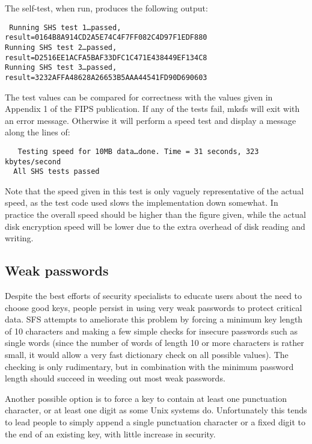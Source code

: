 The self-test, when run, produces the following output:

{\small \tt
  Running SHS test 1\dots passed, result=0164B8A914CD2A5E74C4F7FF082C4D97F1EDF880\\
  Running SHS test 2\dots passed, result=D2516EE1ACFA5BAF33DFC1C471E438449EF134C8\\
  Running SHS test 3\dots passed, result=3232AFFA48628A26653B5AAA44541FD90D690603}

The test values can be compared for correctness with the values given in
Appendix 1 of the FIPS publication.  If any of the tests fail, mksfs will exit
with an error message.  Otherwise it will perform a speed test and display a
message along the lines of:

{\small \tt
\verb|  |Testing speed for 10MB data\dots done.  Time = 31 seconds, 323 kbytes/second\\
\verb|  |All SHS tests passed
}

Note that the speed given in this test is only vaguely representative of the
actual speed, as the test code used slows the implementation down somewhat.  In
practice the overall speed should be higher than the figure given, while the
actual disk encryption speed will be lower due to the extra overhead of disk
reading and writing.


\subsection{Weak passwords}

Despite the best efforts of security specialists to educate users about the
need to choose good keys, people persist in using very weak passwords to protect
critical data.  SFS attempts to ameliorate this problem by forcing a minimum
key length of 10 characters and making a few simple checks for insecure
passwords such as single words (since the number of words of length 10 or more
characters is rather small, it would allow a very fast dictionary check on all
possible values).  The checking is only rudimentary, but in combination with
the minimum password length should succeed in weeding out most weak passwords.

Another possible option is to force a key to contain at least one punctuation
character, or at least one digit as some Unix systems do.  Unfortunately this
tends to lead people to simply append a single punctuation character or a fixed
digit to the end of an existing key, with little increase in security.

